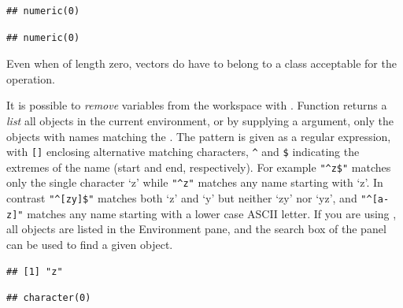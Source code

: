 \documentclass[krantz2]{krantz}\usepackage{knitr}%
\begin{document}
\begin{explainbox}
\begin{knitrout}\footnotesize
{}\color{fgcolor}\begin{kframe}
\begin{alltt}
\hlstd{(}\hlstd{(}\hlstd{))}
\end{alltt}
\begin{verbatim}
## numeric(0)
\end{verbatim}
\begin{alltt}
 \hlopt{+} \hlstd{(}\hlstd{)}
\end{alltt}
\begin{verbatim}
## numeric(0)
\end{verbatim}
\end{kframe}
\end{knitrout}

Even when of length zero, vectors do have to belong to a class acceptable for the operation.

\end{explainbox}

It is possible to \emph{remove} variables from the workspace with . Function  returns a \emph{list} all objects in the current environment, or by supplying a  argument, only the objects with names matching the . The pattern is given as a regular expression, with \verb|[]| enclosing alternative matching characters, \verb|^| and \verb|$| indicating the extremes of the name (start and end, respectively). For example \verb|"^z$"| matches only the single character `z' while \verb|"^z"| matches any name starting with `z'. In contrast \verb|"^[zy]$"| matches both `z' and `y' but neither `zy' nor `yz', and \verb|"^[a-z]"| matches any name starting with a lower case ASCII letter. If you are using , all objects are listed in the Environment pane, and the search box of the panel can be used to find a given object.

\begin{knitrout}\footnotesize
{}\color{fgcolor}\begin{kframe}
\begin{alltt}
\hlstd{(}\hlstd{=}\hlstd{)}
\end{alltt}
\begin{verbatim}
## [1] "z"
\end{verbatim}
\begin{alltt}
\hlstd{(}\hlstd{=}\hlstd{)}
\end{alltt}
\begin{verbatim}
## character(0)
\end{verbatim}
\end{kframe}
\end{knitrout}
\end{document}

